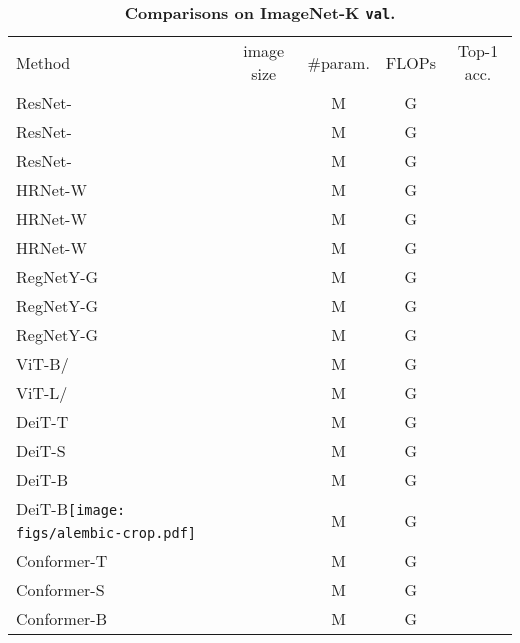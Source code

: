\documentclass{article}
\def \deitbasedisup {DeiT-B\alambic} \def \alambic {\texttt{[image: figs/alembic-crop.pdf]}\xspace}
\begin{document}
\begin{table}[h]
  \footnotesize
  \centering
  \setlength{\tabcolsep}{19 pt}
  \renewcommand{\arraystretch}{1.2}
  \caption{\small\textbf{Comparisons on ImageNet-K \texttt{val}.}
  }
  \label{tab:imagenet_results}
  \begin{tabular}{l|ccc|c}
    \shline
    Method                                        & image size       & \#param. & FLOPs    & {Top-1 acc.} \\
    \shline
    ResNet-~\cite{he2016deep}                 &  & M    & G   &        \\
    ResNet-~\cite{he2016deep}                 &  & M    & G   &        \\
    ResNet-~\cite{he2016deep}                &  & M    & G   &        \\
    \hline
    HRNet-W~\cite{WangSCJDZLMTWLX19}          &  & M  & G   &        \\
    HRNet-W~\cite{WangSCJDZLMTWLX19}          &  & M  & G   &        \\
    HRNet-W~\cite{WangSCJDZLMTWLX19}          &  & M  & G  &        \\ \hline
    RegNetY-G~\cite{radosavovic2020designing}  &  & M    & G   &        \\
    RegNetY-G~\cite{radosavovic2020designing}  &  & M    & G   &        \\
    RegNetY-G~\cite{radosavovic2020designing} &  & M    & G  &        \\
    \hline
    ViT-B/~\cite{dosovitskiy2020image}        &  & M    & G  &        \\
    ViT-L/~\cite{dosovitskiy2020image}        &  & M   & G &        \\
    \hline
    DeiT-T~\cite{touvron2020deit}                 &  & M     & G   &        \\
    DeiT-S~\cite{touvron2020deit}                 &  & M    & G   &        \\
    DeiT-B~\cite{touvron2020deit}                 &  & M    & G  &        \\
    {\deitbasedisup}~\cite{touvron2020deit}       &  & M    & G  &        \\ \hline
    Conformer-T~\cite{peng2021conformer}             &  & M  & G   &        \\
    Conformer-S~\cite{peng2021conformer}             &  & M  & G  &        \\
    Conformer-B~\cite{peng2021conformer}             &  & M  & G  &        \\ \hline

\end{tabular}
\end{table}
\end{document}
